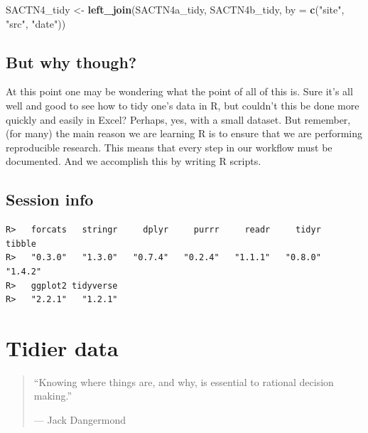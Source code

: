 \documentclass[]{book}
\newenvironment{Shaded}{\begin{snugshade}}{\end{snugshade}}
\newcommand{\KeywordTok}[1]{\textcolor[rgb]{0.13,0.29,0.53}{\textbf{#1}}}
\newcommand{\DataTypeTok}[1]{\textcolor[rgb]{0.13,0.29,0.53}{#1}}
\newcommand{\StringTok}[1]{\textcolor[rgb]{0.31,0.60,0.02}{#1}}
\newcommand{\OperatorTok}[1]{\textcolor[rgb]{0.81,0.36,0.00}{\textbf{#1}}}
\newcommand{\NormalTok}[1]{#1}
\theoremstyle{definition}
\theoremstyle{definition}
\theoremstyle{definition}
\theoremstyle{remark}
\begin{document}
\begin{Shaded}
\begin{Highlighting}[]
\NormalTok{SACTN4_tidy <-}\StringTok{ }\KeywordTok{left_join}\NormalTok{(SACTN4a_tidy, SACTN4b_tidy, }\DataTypeTok{by =} \KeywordTok{c}\NormalTok{(}\StringTok{"site"}\NormalTok{, }\StringTok{"src"}\NormalTok{, }\StringTok{"date"}\NormalTok{))}
\end{Highlighting}
\end{Shaded}

\section{But why though?}\label{but-why-though}

At this point one may be wondering what the point of all of this is.
Sure it's all well and good to see how to tidy one's data in R, but
couldn't this be done more quickly and easily in Excel? Perhaps, yes,
with a small dataset. But remember, (for many) the main reason we are
learning R is to ensure that we are performing reproducible research.
This means that every step in our workflow must be documented. And we
accomplish this by writing R scripts.

\section{Session info}\label{session-info-9}

\begin{Shaded}
\end{Shaded}

\begin{verbatim}
R>   forcats   stringr     dplyr     purrr     readr     tidyr    tibble 
R>   "0.3.0"   "1.3.0"   "0.7.4"   "0.2.4"   "1.1.1"   "0.8.0"   "1.4.2" 
R>   ggplot2 tidyverse 
R>   "2.2.1"   "1.2.1"
\end{verbatim}

\chapter{Tidier data}\label{tidier}

\begin{quote}
``Knowing where things are, and why, is essential to rational decision
making.''

--- Jack Dangermond
\end{quote}
\end{document}
